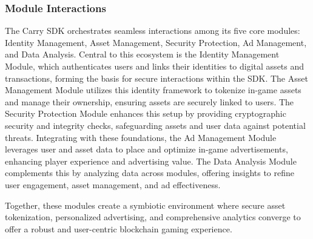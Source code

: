 \subsubsection{Module Interactions}
The Carry SDK orchestrates seamless interactions among its five core modules: Identity Management, Asset Management, Security Protection, Ad Management, and Data Analysis. Central to this ecosystem is the Identity Management Module, which authenticates users and links their identities to digital assets and transactions, forming the basis for secure interactions within the SDK. The Asset Management Module utilizes this identity framework to tokenize in-game assets and manage their ownership, ensuring assets are securely linked to users. The Security Protection Module enhances this setup by providing cryptographic security and integrity checks, safeguarding assets and user data against potential threats. Integrating with these foundations, the Ad Management Module leverages user and asset data to place and optimize in-game advertisements, enhancing player experience and advertising value. The Data Analysis Module complements this by analyzing data across modules, offering insights to refine user engagement, asset management, and ad effectiveness.

Together, these modules create a symbiotic environment where secure asset tokenization, personalized advertising, and comprehensive analytics converge to offer a robust and user-centric blockchain gaming experience.
